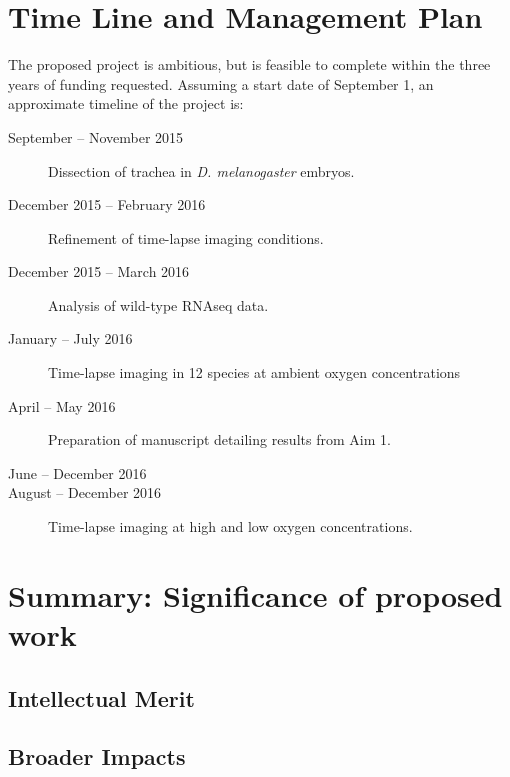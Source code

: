 \documentclass{proposal}
\begin{document}
\section{Time Line and Management Plan}

The proposed project is ambitious, but is feasible to complete within the three years of funding requested.  Assuming a start date of September 1, an approximate timeline of the project is: 

\begin{description}
\item[September -- November 2015] Dissection of trachea in {\em D. melanogaster} embryos.  

\item[December 2015 -- February 2016] Refinement of time-lapse imaging conditions. 

\item[December 2015 -- March 2016] Analysis of wild-type RNAseq data. 

\item[January -- July 2016] Time-lapse imaging in 12 species at ambient oxygen concentrations

\item[April -- May 2016] Preparation of manuscript detailing results from Aim 1.

\item[June -- December 2016] 

\item[August -- December 2016] Time-lapse imaging at high and low oxygen concentrations.


\item[]  

\end{description}



\section{Summary:  Significance of proposed work}

\subsection{Intellectual Merit}

\subsection{Broader Impacts}



\newpage
{}
\renewcommand{\thepage} {E--\arabic{page}}



\end{document}
